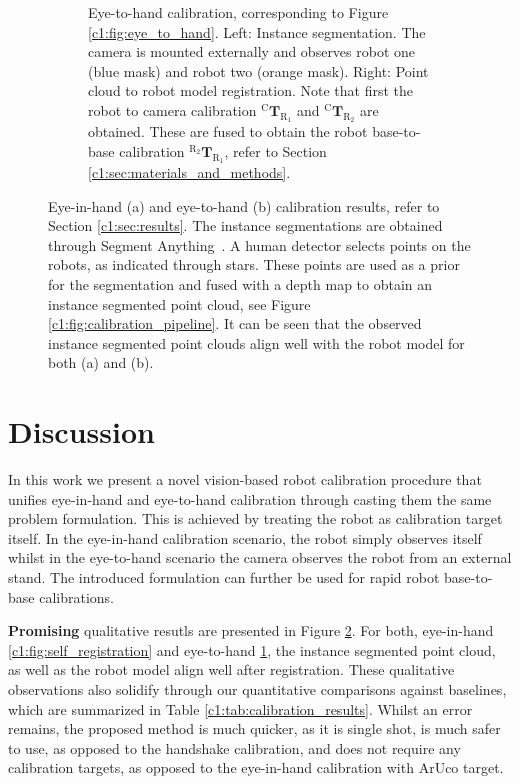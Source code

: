 \begin{figure}
\begin{subfigure}[b]{\textwidth}
         \caption{Eye-to-hand calibration, corresponding to Figure \ref{c1:fig:eye_to_hand}. Left: Instance segmentation. The camera is mounted externally and observes robot one (blue mask) and robot two (orange mask). Right: Point cloud to robot model registration. Note that first the robot to camera calibration $^\text{C}\mathbf{T}_{\text{R}_1}$ and $^\text{C}\mathbf{T}_{\text{R}_2}$ are obtained. These are fused to obtain the robot base-to-base calibration $^{\text{R}_2}\mathbf{T}_{\text{R}_1}$, refer to Section \ref{c1:sec:materials_and_methods}.}
         \label{c1:fig:double_registration}
     \end{subfigure}
     \caption{Eye-in-hand (a) and eye-to-hand (b) calibration results, refer to Section \ref{c1:sec:results}. The instance segmentations are obtained through Segment Anything~\citep{segment_anything}. A human detector selects points on the robots, as indicated through stars. These points are used as a prior for the segmentation and fused with a depth map to obtain an instance segmented point cloud, see Figure \ref{c1:fig:calibration_pipeline}. It can be seen that the observed instance segmented point clouds align well with the robot model for both (a) and (b).}
     \label{c1:fig:registration_results}
\end{figure}


\section{Discussion}%
In this work we present a novel vision-based robot calibration procedure that unifies eye-in-hand and eye-to-hand calibration through casting them the same problem formulation. This is achieved by treating the robot as calibration target itself. In the eye-in-hand calibration scenario, the robot simply observes itself whilst in the eye-to-hand scenario the camera observes the robot from an external stand. The introduced formulation can further be used for rapid robot base-to-base calibrations.

\textbf{Promising} qualitative resutls are presented in Figure \ref{c1:fig:registration_results}. For both, eye-in-hand \ref{c1:fig:self_registration} and eye-to-hand \ref{c1:fig:double_registration}, the instance segmented point cloud, as well as the robot model align well after registration. These qualitative observations also solidify through our quantitative comparisons against baselines, which are summarized in Table \ref{c1:tab:calibration_results}. Whilst an error remains, the proposed method is much quicker, as it is single shot, is much safer to use, as opposed to the handshake calibration, and does not require any calibration targets, as opposed to the eye-in-hand calibration with ArUco target.

